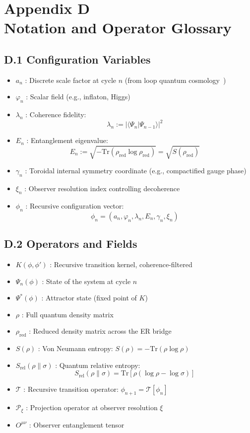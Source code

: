\section*{Appendix D\\Notation and Operator Glossary}
\label{appendix:D}

\subsection*{D.1 Configuration Variables}

\begin{itemize}[leftmargin=1.5em]
  \item $a_n$ : Discrete scale factor at cycle $n$ (from loop quantum cosmology~\cite{ashtekar2006quantum})
  \item $\varphi_n$ : Scalar field (e.g., inflaton, Higgs)
  \item $\lambda_n$ : Coherence fidelity:
  \[
  \lambda_n := |\langle \Psi_n | \Psi_{n-1} \rangle|^2
  \]
  \item $E_n$ : Entanglement eigenvalue:
  \[
  E_n := \sqrt{-\mathrm{Tr}(\rho_{\text{red}} \log \rho_{\text{red}})} = \sqrt{S(\rho_{\text{red}})}
  \]
  \item $\gamma_n$ : Toroidal internal symmetry coordinate (e.g., compactified gauge phase)
  \item $\xi_n$ : Observer resolution index controlling decoherence
  \item $\phi_n$ : Recursive configuration vector:
  \[
  \phi_n = (a_n, \varphi_n, \lambda_n, E_n, \gamma_n, \xi_n)
  \]
\end{itemize}

\subsection*{D.2 Operators and Fields}

\begin{itemize}[leftmargin=1.5em]
  \item $K(\phi, \phi')$ : Recursive transition kernel, coherence-filtered
  \item $\Psi_n(\phi)$ : State of the system at cycle $n$
  \item $\Psi^*(\phi)$ : Attractor state (fixed point of $K$)
  \item $\rho$ : Full quantum density matrix
  \item $\rho_{\text{red}}$ : Reduced density matrix across the ER bridge
  \item $S(\rho)$ : Von Neumann entropy: $S(\rho) = -\mathrm{Tr}(\rho \log \rho)$
  \item $S_{\text{rel}}(\rho \| \sigma)$ : Quantum relative entropy:
  \[
  S_{\text{rel}}(\rho \| \sigma) = \mathrm{Tr}[\rho(\log \rho - \log \sigma)]
  \]
  \item $\mathcal{T}$ : Recursive transition operator: $\phi_{n+1} = \mathcal{T}[\phi_n]$
  \item $\mathcal{P}_\xi$ : Projection operator at observer resolution $\xi$
  \item $O^{\mu\nu}$ : Observer entanglement tensor
\end{itemize}

